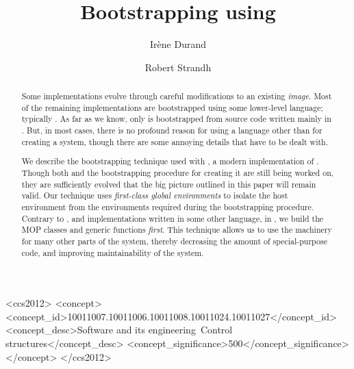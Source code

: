 \documentclass[format=sigconf]{acmart}
\def\inputtex#1{}
\begin{document}
\title{Bootstrapping \commonlisp{} using \commonlisp{}}

\author{Irène Durand
}

\author{Robert Strandh}


\begin{abstract}
Some \commonlisp{} implementations evolve through careful
modifications to an existing \emph{image}.  Most of the remaining
implementations are bootstrapped using some lower-level language;
typically \clanguage{}.  As far as we know, only \sbcl{} is
bootstrapped from source code written mainly in \commonlisp{}.  But,
in most cases, there is no profound reason for using a language other
than \commonlisp{} for creating a \commonlisp{} system, though there
are some annoying details that have to be dealt with.

We describe the bootstrapping technique used with \sicl{}, a modern
implementation of \commonlisp{}.  Though both \sicl{} and the
bootstrapping procedure for creating it are still being worked on, they
are sufficiently evolved that the big picture outlined in this paper
will remain valid.  Our technique uses \emph{first-class global
  environments} to isolate the host environment from the environments
required during the bootstrapping procedure.  Contrary to \sbcl{}, and
implementations written in some other language, in \sicl{}, we build
the \clos{} MOP classes and generic functions \emph{first}.  This
technique allows us to use the \clos{} machinery for many other parts
of the system, thereby decreasing the amount of special-purpose code,
and improving maintainability of the system.
\end{abstract}

\begin{CCSXML}
  <ccs2012>
  <concept>
  <concept_id>10011007.10011006.10011008.10011024.10011027</concept_id>
  <concept_desc>Software and its engineering~Control structures</concept_desc>
  <concept_significance>500</concept_significance>
  </concept>
  </ccs2012>
\end{CCSXML}



\maketitle


\inputtex{sec-introduction.tex}
\inputtex{sec-previous.tex}
\inputtex{sec-sicl.tex}
\inputtex{sec-our-method.tex}
\inputtex{sec-benefits.tex}
\inputtex{sec-conclusions.tex}
\inputtex{sec-acknowledgments.tex}



\end{document}

